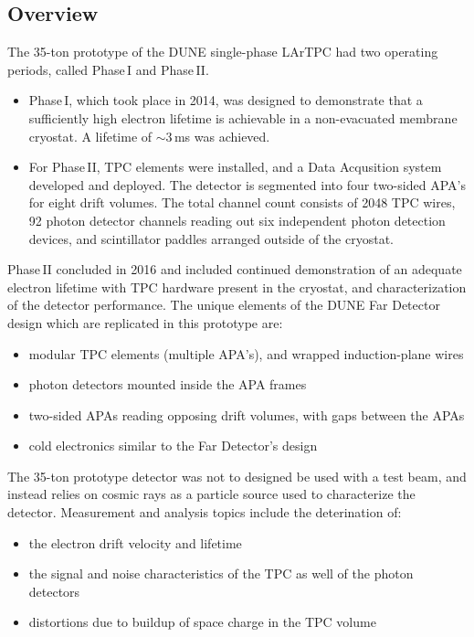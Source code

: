 \label{sec:35t}
\subsection{Overview}
The 35-ton prototype of the DUNE single-phase LArTPC had two operating periods, called Phase\,I and Phase\,II.
\begin{itemize}

\item Phase\,I, which took place in 2014, was designed to demonstrate that a sufficiently high electron
lifetime is achievable in a non-evacuated membrane cryostat. A lifetime of $\sim$3\,ms was achieved.

\item For Phase\,II, TPC elements were installed, and a Data Acqusition system developed and deployed. 
The detector is segmented into four two-sided APA's for eight drift volumes. The total channel count
consists of 2048 TPC wires, 92 photon detector channels reading out six independent photon
detection devices, and scintillator paddles arranged outside of the cryostat.

\end{itemize}

\noindent
Phase\,II concluded in 2016 and included continued demonstration of an adequate electron
lifetime with TPC hardware present in the cryostat, and characterization of the detector performance.
The unique elements of the DUNE Far Detector design which are replicated in this prototype are:
\begin{itemize}
\item  modular TPC elements (multiple APA's), and wrapped induction-plane wires
\item photon detectors mounted inside the APA frames
\item two-sided APAs reading opposing drift volumes, with gaps between the APAs
\item cold electronics similar to the Far Detector's design
\end{itemize}

\noindent
The 35-ton prototype detector was not to designed be used with a test beam, and instead relies on cosmic rays as
a particle source used to characterize the detector.
 Measurement and analysis topics include the deterination of:
\begin{itemize}
\item the electron drift velocity and lifetime
\item the signal and noise characteristics of the TPC as well of the photon detectors
\item distortions due to buildup of space charge in the TPC volume
\end{itemize}

